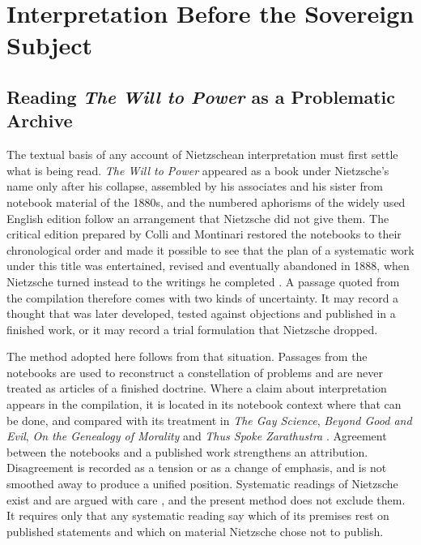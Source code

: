 \part{Interpretation Before the Sovereign Subject}

\chapter{Reading \emph{The Will to Power} as a Problematic Archive}

The textual basis of any account of Nietzschean interpretation must first settle what is being read. \emph{The Will to Power} appeared as a book under Nietzsche's name only after his collapse, assembled by his associates and his sister from notebook material of the 1880s, and the numbered aphorisms of the widely used English edition \citep{kaufmann1967} follow an arrangement that Nietzsche did not give them. The critical edition prepared by Colli and Montinari restored the notebooks to their chronological order and made it possible to see that the plan of a systematic work under this title was entertained, revised and eventually abandoned in 1888, when Nietzsche turned instead to the writings he completed \citep{montinari1982}. A passage quoted from the compilation therefore comes with two kinds of uncertainty. It may record a thought that was later developed, tested against objections and published in a finished work, or it may record a trial formulation that Nietzsche dropped.

The method adopted here follows from that situation. Passages from the notebooks are used to reconstruct a constellation of problems and are never treated as articles of a finished doctrine. Where a claim about interpretation appears in the compilation, it is located in its notebook context where that can be done, and compared with its treatment in \emph{The Gay Science}, \emph{Beyond Good and Evil}, \emph{On the Genealogy of Morality} and \emph{Thus Spoke Zarathustra} \citep{nietzsche1974,nietzsche1966,nietzsche1967gm,nietzsche2006}. Agreement between the notebooks and a published work strengthens an attribution. Disagreement is recorded as a tension or as a change of emphasis, and is not smoothed away to produce a unified position. Systematic readings of Nietzsche exist and are argued with care \citep{richardson1996}, and the present method does not exclude them. It requires only that any systematic reading say which of its premises rest on published statements and which on material Nietzsche chose not to publish.

